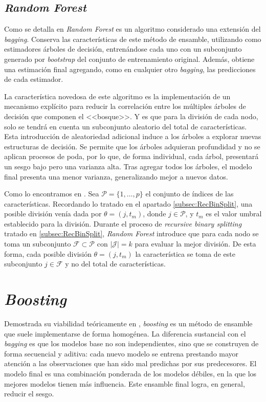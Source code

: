 \documentclass[titlepage, 11pt]{book}
\begin{document}
\subsection{\textit{Random Forest}}
Como se detalla en \cite{ISLP} \textit{Random Forest} es un algoritmo considerado una extensión del \textit{bagging}. Conserva las características de este método de ensamble, utilizando como estimadores árboles de decisión, entrenándose cada uno con un subconjunto generado por \textit{bootstrap} del conjunto de entrenamiento original. Además, obtiene una estimación final agregando, como en cualquier otro \textit{bagging}, las predicciones de cada estimador.

La característica novedosa de este algoritmo es la implementación de un mecanismo explícito para reducir la correlación entre los múltiples árboles de decisión que componen el <<bosque>>. Y es que para la división de cada nodo, solo se tendrá en cuenta un subconjunto aleatorio del total de características. Esta introducción de aleatoriedad adicional induce a los árboles a explorar nuevas estructuras de decisión. Se permite que los árboles adquieran profundidad y no se aplican procesos de poda, por lo que, de forma individual, cada árbol, presentará un sesgo bajo pero una varianza alta. Tras agregar todos los árboles, el modelo final presenta una menor varianza, generalizando mejor a nuevos datos.

Como lo encontramos en \cite{breiman2001random}. Sea $\mathcal{P}= \{1,\ldots,p \}$ el conjunto de índices de las características. Recordando lo tratado en el apartado \ref{subsec:RecBinSplit}, una posible división venía dada por $\theta =(j,t_m)$, donde $j \in \mathcal{P}$, y $t_m$ es el valor umbral establecido para la división. Durante el proceso de \textit{recursive binary splitting} tratado en \ref{subsec:RecBinSplit}, \textit{Random Forest} introduce que para cada nodo se toma un subconjunto $\mathcal{F} \subset \mathcal{P}$ con $|\mathcal{J}|=k$ para evaluar la mejor división. De esta forma, cada posible división $\theta =(j,t_m)$ la característica se toma de este subconjunto $j \in \mathcal{F}$ y no del total de características.

\section{\textit{Boosting}}
Demostrada su viabilidad teóricamente en \cite{schapire1990strength}, \textit{boosting} es un método de ensamble que suele implementarse de forma homogénea. La diferencia sustancial con el \textit{bagging} es que los modelos base no son independientes, sino que se construyen de forma secuencial y aditiva: cada nuevo modelo se entrena prestando mayor atención a las observaciones que han sido mal predichas por sus predecesores. El modelo final es una combinación ponderada de los modelos débiles, en la que los mejores modelos tienen más influencia. Este ensamble final logra, en general, reducir el sesgo.
\end{document}
